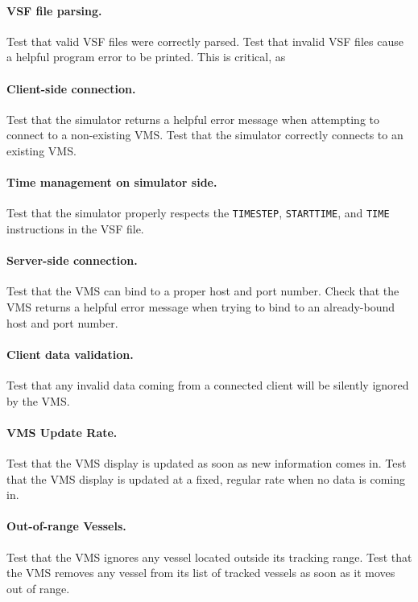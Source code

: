 \documentclass{article}
\begin{document}
\paragraph{VSF file parsing.} Test that valid VSF files were correctly parsed. Test that invalid VSF files cause a helpful program error to be printed. This is critical, as 

\paragraph{Client-side connection.} Test that the simulator returns a helpful error message when attempting to connect to a non-existing VMS. Test that the simulator correctly connects to an existing VMS.

\paragraph{Time management on simulator side.} Test that the simulator properly respects the \verb|TIMESTEP|, \verb|STARTTIME|, and \verb|TIME| instructions in the VSF file.

\paragraph{Server-side connection.} Test that the VMS can bind to a proper host and port number. Check that the VMS returns a helpful error message when trying to bind to an already-bound host and port number.

\paragraph{Client data validation.} Test that any invalid data coming from a connected client will be silently ignored by the VMS.

\paragraph{VMS Update Rate.} Test that the VMS display is updated as soon as new information comes in. Test that the VMS display is updated at a fixed, regular rate when no data is coming in.

\paragraph{Out-of-range Vessels.} Test that the VMS ignores any vessel located outside its tracking range. Test that the VMS removes any vessel from its list of tracked vessels as soon as it moves out of range.
\end{document}
